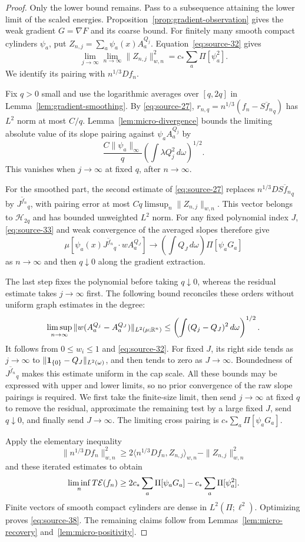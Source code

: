 \begin{proof}
Only the lower bound remains. Pass to a subsequence attaining the lower
limit of the scaled energies. Proposition~\ref{prop:gradient-observation}
gives the weak gradient $G=\nabla F$ and its coarse bound. For finitely
many smooth compact cylinders $\psi_a$, put
$Z_{n,j}=\sum_a\psi_a(x)A_a^{Q_j}$. Equation~\eqref{eq:source-32} gives
\[
 \lim_{j\to\infty}\lim_{n\to\infty}\|Z_{n,j}\|_{w,n}^2
                         =c_*\sum_a\Pi[\psi_a^2].
\]
We identify its pairing with $n^{1/3}Df_n$.

Fix $q>0$ small and use the logarithmic averages over $[q,2q]$ in
Lemma~\ref{lem:gradient-smoothing}. By \eqref{eq:source-27},
$r_{n,q}=n^{1/3}(f_n-\overline{S f_n}_q)$ has $L^2$ norm at most $C/q$.
Lemma~\ref{lem:micro-divergence} bounds the limiting absolute value of its
slope pairing against $\psi_aA_a^{Q_j}$ by
\[
 \frac{C\|\psi_a\|_\infty}{q}
           \left(\int\lambda Q_j^2\,d\omega\right)^{1/2}.
\]
This vanishes when $j\to\infty$ at fixed $q$, after $n\to\infty$.

For the smoothed part, the second estimate of \eqref{eq:source-27}
replaces $n^{1/3}D\overline{S f_n}_q$ by $\overline{J^{f_n}}_q$,
with pairing error at most $Cq\limsup_n\|Z_{n,j}\|_{w,n}$.
This vector belongs to $\mathcal H_{2q}$ and has bounded unweighted
$L^2$ norm. For any fixed polynomial index $J$, \eqref{eq:source-33}
and weak convergence of the averaged slopes therefore give
\[
 \mu\!\left[\psi_a(x)\overline{J^{f_n}}_q\cdot wA_a^{Q_J}\right]
 \longrightarrow
       \left(\int Q_J\,d\omega\right)\Pi[\psi_aG_a]
\]
as $n\to\infty$ and then $q\downarrow0$ along the gradient extraction.

The last step fixes the polynomial before taking $q\downarrow0$, whereas
the residual estimate takes $j\to\infty$ first. The following bound
reconciles these orders without uniform graph estimates in the degree:
\[
 \limsup_{n\to\infty}
 \|w(A_a^{Q_j}-A_a^{Q_J})\|_{L^2(\mu;\mathbb R^n)}
 \le\left(\int(Q_j-Q_J)^2\,d\omega\right)^{1/2}.
\]
It follows from $0\le w_i\le1$ and \eqref{eq:source-32}.
For fixed $J$, its right side tends as $j\to\infty$ to
$\|\mathbf 1_{\{0\}}-Q_J\|_{L^2(\omega)}$, and then tends to zero as
$J\to\infty$. Boundedness of $\overline{J^{f_n}}_q$ makes this estimate
uniform in the cap scale. All these bounds may be expressed with upper
and lower limits, so no prior convergence of the raw slope pairings is
required. We first take the finite-size limit, then send $j\to\infty$
at fixed $q$ to remove the residual, approximate the
remaining test by a large fixed $J$, send $q\downarrow0$, and finally send
$J\to\infty$. The limiting cross pairing is
$c_*\sum_a\Pi[\psi_aG_a]$.

Apply the elementary inequality
\[
 \|n^{1/3}Df_n\|_{w,n}^2
   \ge2\langle n^{1/3}Df_n,Z_{n,j}\rangle_{w,n}
                                      -\|Z_{n,j}\|_{w,n}^2
\]
and these iterated estimates to obtain
\[
 \liminf_nT\mathcal E(f_n)
       \ge2c_*\sum_a\Pi[\psi_aG_a]-c_*\sum_a\Pi[\psi_a^2].
\]
Finite vectors of smooth compact cylinders are dense in
$L^2(\Pi;\ell^2)$. Optimizing proves \eqref{eq:source-38}.
The remaining claims follow from Lemmas~\ref{lem:micro-recovery}
and~\ref{lem:micro-positivity}.
\end{proof}

